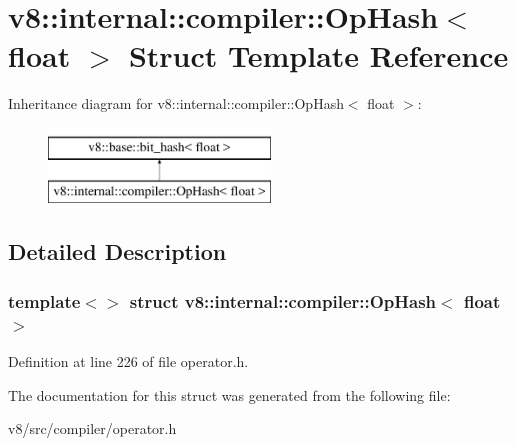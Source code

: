\hypertarget{structv8_1_1internal_1_1compiler_1_1OpHash_3_01float_01_4}{}\section{v8\+:\+:internal\+:\+:compiler\+:\+:Op\+Hash$<$ float $>$ Struct Template Reference}
\label{structv8_1_1internal_1_1compiler_1_1OpHash_3_01float_01_4}
Inheritance diagram for v8\+:\+:internal\+:\+:compiler\+:\+:Op\+Hash$<$ float $>$\+:\begin{figure}[H]
\begin{center}
\leavevmode
\includegraphics[height=2.000000cm]{structv8_1_1internal_1_1compiler_1_1OpHash_3_01float_01_4}
\end{center}
\end{figure}


\subsection{Detailed Description}
\subsubsection*{template$<$$>$\newline
struct v8\+::internal\+::compiler\+::\+Op\+Hash$<$ float $>$}



Definition at line 226 of file operator.\+h.



The documentation for this struct was generated from the following file\+:\begin{DoxyCompactItemize}
\item 
v8/src/compiler/operator.\+h\end{DoxyCompactItemize}
